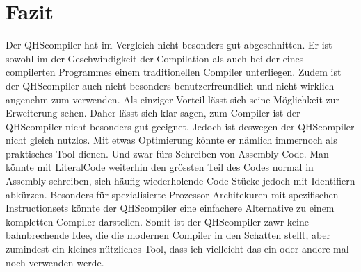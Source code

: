 \chapter{Fazit}
Der QHScompiler hat im Vergleich nicht besonders gut abgeschnitten. Er ist sowohl im der Geschwindigkeit der Compilation als auch bei der eines compilerten Programmes einem traditionellen Compiler unterliegen.
Zudem ist der QHScompiler auch nicht besonders benutzerfreundlich und nicht wirklich angenehm zum verwenden. Als einziger Vorteil lässt sich seine Möglichkeit zur Erweiterung sehen.
Daher lässt sich klar sagen, zum Compiler ist der QHScompiler nicht besonders gut geeignet. Jedoch ist deswegen der QHScompiler nicht gleich nutzlos. Mit etwas Optimierung könnte er nämlich immernoch als praktisches Tool dienen. 
Und zwar fürs Schreiben von Assembly Code. Man könnte mit LiteralCode weiterhin den grössten Teil des Codes normal in Assembly schreiben, sich häufig wiederholende Code Stücke jedoch mit Identifiern abkürzen.
Besonders für spezialisierte Prozessor Architekuren mit spezifischen Instructionsets könnte der QHScompiler eine einfachere Alternative zu einem kompletten Compiler darstellen.
Somit ist der QHScompiler zawr keine bahnbrechende Idee, die die modernen Compiler in den Schatten stellt, aber zumindest ein kleines nützliches Tool, dass ich vielleicht das ein oder andere mal noch verwenden werde.